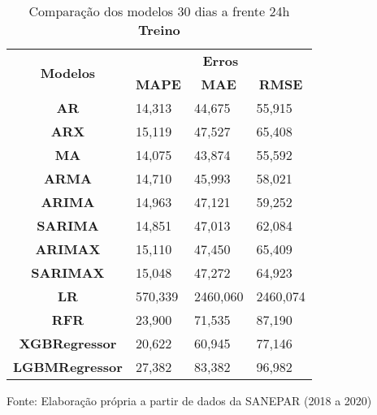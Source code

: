 \begin{table}[H]
	\centering
	\caption{Comparação dos modelos 30 dias a frente 24h \textbf{Treino} }\label{tb:60-24trn}
	\begin{tabular}{@{}clll@{}}
		\toprule
		\multirow{2}{*}{\textbf{Modelos}} & \multicolumn{3}{c}{\textbf{Erros}}                                                                       \\ \cmidrule(l){2-4} 
		& \multicolumn{1}{c}{\textbf{MAPE}} & \multicolumn{1}{c}{\textbf{MAE}} & \multicolumn{1}{c}{\textbf{RMSE}} \\ \hline
\textbf{AR}                       & 14,313                            & 44,675                           & 55,915                            \\
\textbf{ARX}                      & 15,119                            & 47,527                           & 65,408                            \\
\textbf{MA}                       & 14,075                            & 43,874                           & 55,592                            \\
\textbf{ARMA}                     & 14,710                            & 45,993                           & 58,021                            \\
\textbf{ARIMA}                    & 14,963                            & 47,121                           & 59,252                            \\
\textbf{SARIMA}                   & 14,851                            & 47,013                           & 62,084                            \\
\textbf{ARIMAX}                   & 15,110                            & 47,450                           & 65,409                            \\
\textbf{SARIMAX}                  & 15,048                            & 47,272                           & 64,923                            \\
\textbf{LR}        & 570,339                           & 2460,060                         & 2460,074                          \\
\textbf{RFR}  & 23,900                            & 71,535                           & 87,190                            \\
\textbf{XGBRegressor}             & 20,622                            & 60,945                           & 77,146                            \\
\textbf{LGBMRegressor}            & 27,382                            & 83,382                           & 96,982                            \\ \bottomrule
	\end{tabular}

Fonte: Elaboração própria a partir de dados da SANEPAR (2018 a 2020)
\end{table}

